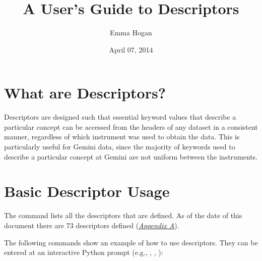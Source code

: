 \documentclass[letterpaper,10pt,english]{sphinxmanual}
\title{A User's Guide to Descriptors}
\date{April 07, 2014}
\author{Emma Hogan}
\begin{document}
\maketitle
\tableofcontents
{}\label{index-latex::doc}



\chapter{What are Descriptors?}
\label{whataredescriptors:a-user-s-guide-to-descriptors}\label{whataredescriptors::doc}\label{whataredescriptors:what-are-descriptors}\label{whataredescriptors:id1}
Descriptors are designed such that essential keyword values that describe a
particular concept can be accessed from the headers of any dataset in a
consistent manner, regardless of which instrument was used to obtain the
data. This is particularly useful for Gemini data, since the majority of
keywords used to describe a particular concept at Gemini are not uniform
between the instruments.


\chapter{Basic Descriptor Usage}
\label{basicusage:basic-descriptor-usage}\label{basicusage::doc}\label{basicusage:id1}
The command  lists all the descriptors that are defined. As of
the date of this document there are 73 descriptors defined ({\hyperref[appendices/appendixA:appendix-typewalk]{\emph{Appendix A}}}).

The following commands show an example of how to use descriptors. They can be
entered at an interactive Python prompt (e.g., , ,
):
\end{document}
